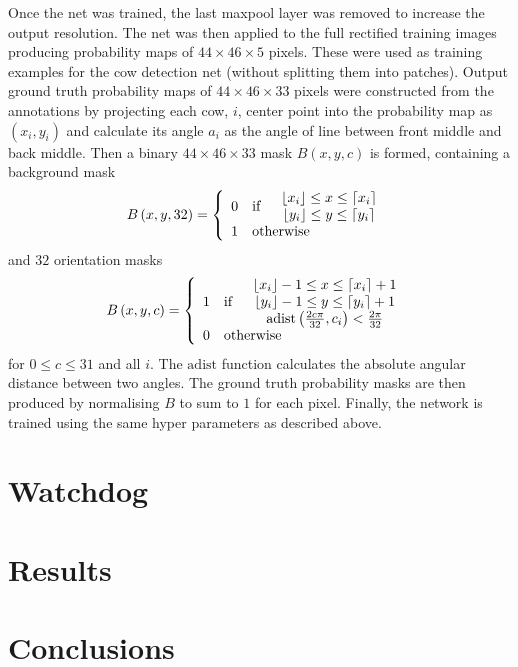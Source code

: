 \documentclass[10pt,a4paper,twocolumn]{article}
\begin{document}
Once the net was trained, the last maxpool layer was removed to increase the output resolution. The net was then applied to the full rectified training images producing probability maps of $44\times 46\times 5$ pixels. These were used as training examples for the cow detection net (without splitting them into patches). Output ground truth probability maps of $44\times 46\times 33$ pixels were constructed from the annotations by projecting each cow, $i$, center point into the probability map as $\left( x_i, y_i \right)$ and calculate its angle $a_i$ as the angle of line between front middle and back middle. Then a binary $44\times 46\times 33$ mask $B\left( x, y, c \right)$ is formed, containing a background mask
\begin{equation}
B\left( x, y, 32 \right) = \left\lbrace
\begin{array}{clc}
0 & \text{if} &
\begin{array}{c}
 \lfloor x_i \rfloor \leq x \leq \lceil x_i \rceil \\
 \lfloor y_i \rfloor \leq y \leq \lceil y_i \rceil
\end{array}
\\
1 & \multicolumn{2}{l}{\text{otherwise}}
\end{array}
\right.
\end{equation}
and $32$ orientation masks
\begin{equation}
B\left( x, y, c \right) = \left\lbrace
\begin{array}{clc}
1 & \text{if} &
\begin{array}{c}
 \lfloor x_i \rfloor-1 \leq x \leq \lceil x_i \rceil+1 \\
 \lfloor y_i \rfloor-1 \leq y \leq \lceil y_i \rceil+1 \\
 \mathrm{adist}\left(\frac{2c\pi}{32}, c_i\right) < \frac{2\pi}{32} \\
\end{array}
\\
0 & \multicolumn{2}{l}{\text{otherwise}}
\end{array}
\right.
\end{equation}
for $0\leq c \leq 31$ and all $i$. The $\mathrm{adist}$ function calculates the absolute angular distance between two angles. The ground truth probability masks are then produced by normalising $B$ to sum to $1$ for each pixel. Finally, the network is trained using the same hyper parameters as described above.

\section{Watchdog}

\section{Results}

\section{Conclusions}



\end{document}
